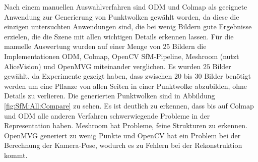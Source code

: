 \documentclass[12pt,titlepage, twoside]{article}
\begin{document}
Nach einem manuellen Auswahlverfahren sind ODM und Colmap als geeignete Anwendung zur Generierung von Punktwolken gewählt worden, 
da diese die einzigen untersuchten Anwendungen sind, die bei wenig Bildern gute Ergebnisse erzielen, die die Szene mit allen wichtigen Details erkennen lassen.
Für die manuelle Auswertung wurden auf einer Menge von $25$ Bildern die Implementationen ODM, Colmap, OpenCV SfM-Pipeline, Meshroom (nutzt AliceVision) und OpenMVG miteinander verglichen. 
Es wurden $25$ Bilder gewählt, da Experimente gezeigt haben, dass zwischen $20$ bis $30$ Bilder benötigt werden um eine Pflanze von allen Seiten in einer Punktwolke abzubilden, ohne Details zu verlieren.
Die generierten Punktwolken sind in Abbildung \ref{fig:SfM:All:Compare} zu sehen.
Es ist deutlich zu erkennen, dass bis auf Colmap und ODM alle anderen Verfahren schwerwiegende Probleme in der Representation haben. Meshroom hat Probleme, feine Strukturen zu erkennen. 
OpenMVG generiert zu wenig Punkte und OpenCV hat ein Problem bei der Berechnung der Kamera-Pose, wodurch es zu Fehlern bei der Rekonstruktion kommt.
\end{document}
